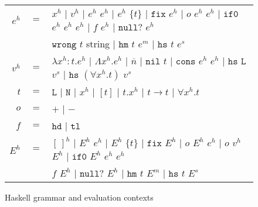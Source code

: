 \begin{figure}[p]
\centering
\begin{tabular}{rcl}

$e^h$ & $=$ & $x^h$ $|$ $v^h$ $|$ $e^h$ $e^h$ $|$ $e^h$ $\lbrace t\rbrace$ $|$ $\mathtt{fix}$ $e^h$ $|$ $o$ $e^h$ $e^h$ $|$ $\mathtt{if0}$ $e^h$ $e^h$ $e^h$ $|$ $f$ $e^h$ $|$ $\mathtt{null?}$ $e^h$ \\

&& $\mathtt{wrong}$ $t$ string $|$ $\mathtt{hm}$ $t$ $e^m$ $|$ $\mathtt{hs}$ $t$ $e^s$ \\

$v^h$ & $=$ & $\lambda x^h:t.e^h$ $|$ $\Lambda x^h.e^h$ $|$ $\overline{n}$ $|$ $\mathtt{nil}$ $t$ $|$ $\mathtt{cons}$ $e^h$ $e^h$ $|$ $\mathtt{hs}$ $\mathtt{L}$ $v^s$ $|$ $\mathtt{hs}$ $(\forall x^h.t)$ $v^s$ \\

$t$ & $=$ & $\mathtt{L}$ $|$ $\mathtt{N}$ $|$ $x^h$ $|$ $[t]$ $|$ $t.x^h$ $|$ $t\rightarrow t$ $|$ $\forall x^h.t$ \\

$o$ & $=$ & $+$ $|$ $-$ \\

$f$ & $=$ & $\mathtt{hd}$ $|$ $\mathtt{tl}$ \\

$E^h$ & $=$ & $[\,]^h$ $|$ $E^h$ $e^h$ $|$ $E^h$ $\lbrace t\rbrace$ $|$ $\mathtt{fix}$ $E^h$ $|$ $o$ $E^h$ $e^h$ $|$ $o$ $v^h$ $E^h$ $|$ $\mathtt{if0}$ $E^h$ $e^h$ $e^h$ \\
&& $f$ $E^h$ $|$ $\mathtt{null?}$ $E^h$ $|$ $\mathtt{hm}$ $t$ $E^m$ $|$ $\mathtt{hs}$ $t$ $E^s$

\end{tabular}
\caption{Haskell grammar and evaluation contexts}
\label{hg}
\end{figure}